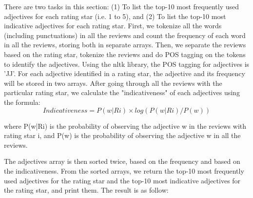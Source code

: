 There are two tasks in this section: (1) To list the top-10 most frequently used adjectives for each rating star (i.e. 1 to 5), and (2) To list the top-10 most indicative adjectives for each rating star. First, we tokenize all the words (including punctuations) in all the reviews and count the frequency of each word in all the reviews, storing both in separate arrays. Then, we separate the reviews based on the rating star, tokenize the reviews and do POS tagging on the tokens to identify the adjectives. Using the nltk library, the POS tagging for adjectives is 'JJ'. For each adjective identified in a rating star, the adjective and its frequency will be stored in two arrays. After going through all the reviews with the particular rating star, we calculate the "indicativeness" of each adjectives using the formula:
    \begin{equation}
        Indicativeness = P(w|Ri)×log(P(w|Ri)/P(w))
    \end{equation}
    
    where P(w|Ri) is the probability of observing the adjective w in the reviews with rating star i, and P(w) is the probability of observing the adjective w in all the reviews.
    
The adjectives array is then sorted twice, based on the frequency and based on the indicativeness. From the sorted arrays, we return the top-10 most frequently used adjectives for the rating star and the top-10 most indicative adjectives for the rating star, and print them. The result is as follow:

